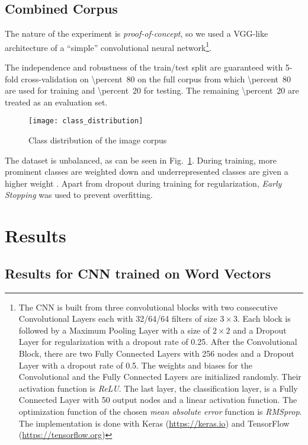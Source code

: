 \subsection{Combined Corpus}
The nature of the experiment is \emph{proof-of-concept}, so we used a VGG-like architecture of a \enquote{simple} convolutional neural network\footnote{The CNN is built from three convolutional blocks with two consecutive Convolutional Layers each with 32/64/64 filters of size $ 3 \times 3 $. Each block is followed by a Maximum Pooling Layer with a size of $ 2 \times 2 $ and a Dropout Layer for regularization with a dropout rate of \num{0.25}. After the Convolutional Block, there are two Fully Connected Layers with \num{256} nodes and a Dropout Layer with a dropout rate of \num{0.5}. The weights and biases for the Convolutional and the Fully Connected Layers are initialized randomly. Their activation function is \emph{ReLU}. The last layer, the classification layer, is a Fully Connected Layer with \num{50} output nodes and a linear activation function. The optimization function of the chosen \emph{mean absolute error} function is \emph{RMSprop}. The implementation is done with Keras (\url{https://keras.io}) and TensorFlow (\url{https://tensorflow.org})}.

The independence and robustness of the train/test split are guaranteed with 5-fold cross-validation on \SI{\percent}{80} on the full corpus from which \SI{\percent}{80} are used for training and \SI{\percent}{20} for testing. The remaining \SI{\percent}{20} are treated as an evaluation set.

\begin{figure}
    \centering
    \texttt{[image: class\_distribution]}
    \caption{Class distribution of the image corpus}
    \label{fig:class_distribution}
\end{figure}

The dataset is unbalanced, as can be seen in Fig.~\ref{fig:class_distribution}. During training, more prominent classes are weighted down and underrepresented classes are given a higher weight \parencite[p.~27]{johnson_SurveyDeepLearningClassImbalance_2019}. Apart from dropout during training for regularization, \emph{Early Stopping} was used to prevent overfitting.


\section{Results}

\subsection{Results for CNN trained on Word Vectors}

